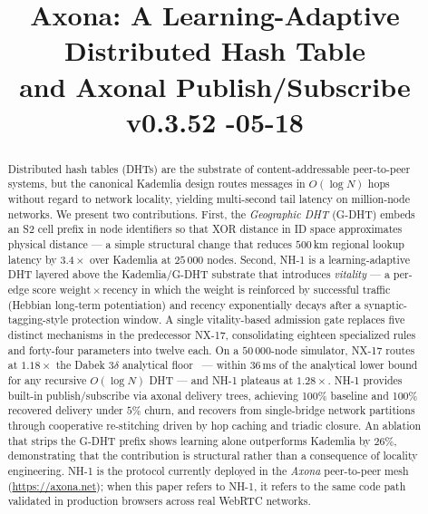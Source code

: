 \documentclass[conference]{IEEEtran}
\title{Axona: A Learning-Adaptive Distributed Hash Table\\and Axonal Publish/Subscribe\\[0.3em]{\normalsize\normalfont v0.3.52 \quad 2026-05-18}}
\author{
\IEEEauthorblockN{David A. Smith}
\IEEEauthorblockA{Axona.net\\
\texttt{davidasmith@gmail.com}}
}
\newcommand{\nhone}{NH-1\xspace}
\newcommand{\GDHT}{G-DHT\xspace}
\newcommand{\NXseventeen}{NX-17\xspace}
\begin{document}
\maketitle
\pagestyle{plain}
\thispagestyle{plain}

\begin{abstract}
Distributed hash tables (DHTs) are the substrate of content-addressable
peer-to-peer systems, but the canonical Kademlia design routes messages in
$O(\log N)$ hops without regard to network locality, yielding multi-second
tail latency on million-node networks. We present two contributions.
First, the \emph{Geographic DHT} (\GDHT) embeds an S2 cell prefix in
node identifiers so that XOR distance in ID space approximates physical
distance --- a simple structural change that reduces $500$\,km regional
lookup latency by $3.4\times$ over Kademlia at $25\,000$ nodes. Second,
\nhone is a learning-adaptive DHT layered above the Kademlia/\GDHT
substrate that introduces \emph{vitality} --- a per-edge score
$\mathrm{weight} \times \mathrm{recency}$ in which the weight is
reinforced by successful traffic (Hebbian long-term potentiation) and
recency exponentially decays after a synaptic-tagging-style protection
window. A single vitality-based admission gate replaces five distinct
mechanisms in the predecessor \NXseventeen, consolidating eighteen
specialized rules and forty-four parameters into twelve each. On a
$50\,000$-node simulator, \NXseventeen routes at $1.18\times$ the Dabek
$3\delta$ analytical floor~\cite{dabek2004designing} --- within $36$\,ms
of the analytical lower bound for any recursive $O(\log N)$ DHT --- and
\nhone plateaus at $1.28\times$. \nhone provides built-in publish/subscribe
via axonal delivery trees, achieving 100\% baseline and 100\% recovered
delivery under $5\%$ churn, and recovers from single-bridge network
partitions through cooperative re-stitching driven by hop caching and
triadic closure. An ablation that strips the \GDHT prefix shows learning
alone outperforms Kademlia by $26\%$, demonstrating that the
contribution is structural rather than a consequence of locality
engineering. \nhone is the protocol currently deployed in the
\emph{Axona} peer-to-peer mesh (\url{https://axona.net}); when this
paper refers to \nhone, it refers to the same code path validated in
production browsers across real WebRTC networks.
\end{abstract}
\end{document}
